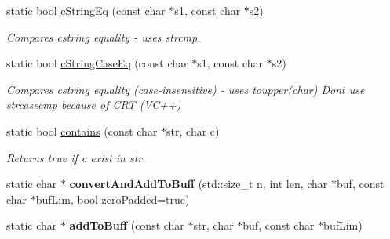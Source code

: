 \begin{DoxyCompactItemize}
\mbox{\label{classel_1_1base_1_1utils_1_1_str_a8081458c7848ff991d765c69f7858c44}} 
static bool \hyperlink{classel_1_1base_1_1utils_1_1_str_a8081458c7848ff991d765c69f7858c44}{c\+String\+Eq} (const char $\ast$s1, const char $\ast$s2)
\begin{DoxyCompactList}\small\item\em Compares cstring equality -\/ uses strcmp. \end{DoxyCompactList}\item 
\mbox{\label{classel_1_1base_1_1utils_1_1_str_aaa37755d713b5e6475950134ce9ce0e8}} 
static bool \hyperlink{classel_1_1base_1_1utils_1_1_str_aaa37755d713b5e6475950134ce9ce0e8}{c\+String\+Case\+Eq} (const char $\ast$s1, const char $\ast$s2)
\begin{DoxyCompactList}\small\item\em Compares cstring equality (case-\/insensitive) -\/ uses toupper(char) Dont use strcasecmp because of C\+RT (V\+C++) \end{DoxyCompactList}\item 
\mbox{\label{classel_1_1base_1_1utils_1_1_str_a27cc1c1625b21597eb75df62b8fca0f8}} 
static bool \hyperlink{classel_1_1base_1_1utils_1_1_str_a27cc1c1625b21597eb75df62b8fca0f8}{contains} (const char $\ast$str, char c)
\begin{DoxyCompactList}\small\item\em Returns true if c exist in str. \end{DoxyCompactList}\item 
\mbox{\label{classel_1_1base_1_1utils_1_1_str_a5e12c163bf1085441ea5453fd6c62fa0}} 
static char $\ast$ {\bfseries convert\+And\+Add\+To\+Buff} (std\+::size\+\_\+t n, int len, char $\ast$buf, const char $\ast$buf\+Lim, bool zero\+Padded=true)
\item 
\mbox{\label{classel_1_1base_1_1utils_1_1_str_aa6a96f625f71661c02ecd5366533abaa}} 
static char $\ast$ {\bfseries add\+To\+Buff} (const char $\ast$str, char $\ast$buf, const char $\ast$buf\+Lim)
\item 
\mbox{\label{classel_1_1base_1_1utils_1_1_str_adf0c36c9b8276ede18111a866e31db8b}} 

\end{DoxyCompactItemize}
